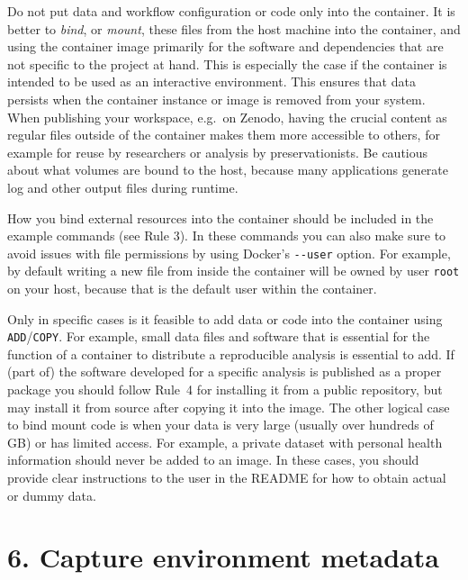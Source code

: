 \documentclass[10pt,letterpaper]{article}
\begin{document}
Do not put data and workflow configuration or code only into the
container. It is better to \emph{bind}, or \emph{mount}, these files
from the host machine into the container, and using the container image
primarily for the software and dependencies that are not specific to the
project at hand. This is especially the case if the container is
intended to be used as an interactive environment. This ensures that
data persists when the container instance or image is removed from your
system. When publishing your workspace, e.g.~on Zenodo, having the
crucial content as regular files outside of the container makes them
more accessible to others, for example for reuse by researchers or
analysis by preservationists. Be cautious about what volumes are bound
to the host, because many applications generate log and other output
files during runtime.

How you bind external resources into the container should be included in
the example commands (see Rule 3). In these commands you can also make
sure to avoid issues with file permissions by using Docker's
\texttt{-\/-user} option. For example, by default writing a new file
from inside the container will be owned by user \texttt{root} on your
host, because that is the default user within the container.

Only in specific cases is it feasible to add data or code into the
container using \texttt{ADD}/\texttt{COPY}. For example, small data
files and software that is essential for the function of a container to
distribute a reproducible analysis is essential to add. If (part of) the
software developed for a specific analysis is published as a proper
package you should follow Rule~4 for installing it from a public
repository, but may install it from source after copying it into the
image. The other logical case to bind mount code is when your data is
very large (usually over hundreds of GB) or has limited access. For
example, a private dataset with personal health information should never
be added to an image. In these cases, you should provide clear
instructions to the user in the README for how to obtain actual or dummy
data.

\hypertarget{capture-environment-metadata}{%
\section*{6. Capture environment
metadata}\label{capture-environment-metadata}}
\end{document}
